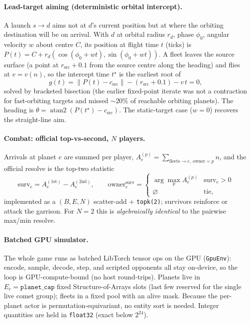 \documentclass[11pt]{article}
\newcommand{\cd}[1]{\texttt{#1}}
\begin{document}
\paragraph{Lead-target aiming (deterministic orbital intercept).} A launch $s\!\to\!d$ aims not at
$d$'s current position but at where the orbiting destination will be on arrival. With $d$ at orbital
radius $r_d$, phase $\phi_0$, angular velocity $w$ about centre $C$, its position at flight time $t$
(ticks) is $P(t)=C+r_d(\cos(\phi_0{+}wt),\sin(\phi_0{+}wt))$. A fleet leaves the source surface (a
point at $r_{\mathrm{src}}{+}0.1$ from the source centre along the heading) and flies at $v=v(n)$, so
the intercept time $t^\star$ is the earliest root of
\begin{equation}
g(t)=\lVert P(t)-c_{\mathrm{src}}\rVert-(r_{\mathrm{src}}{+}0.1)-v\,t=0,
\end{equation}
solved by bracketed bisection (the earlier fixed-point iterate was not a contraction for fast-orbiting
targets and missed $\sim$20\% of reachable orbiting planets). The heading is
$\theta=\operatorname{atan2}(P(t^\star)-c_{\mathrm{src}})$. The static-target case ($w{=}0$) recovers
the straight-line aim.

\paragraph{Combat: official top-vs-second, $N$ players.} Arrivals at planet $e$ are summed per player,
$A_e^{(p)}=\sum_{\text{fleets}\to e,\ \text{owner}=p}n$, and the official resolve is the top-two
statistic
\begin{equation}
\text{surv}_e=A_e^{(1\text{st})}-A_e^{(2\text{nd})},\qquad
\text{owner}^{\text{surv}}_e=\begin{cases}\arg\max_p A_e^{(p)} & \text{surv}_e>0\\
\varnothing & \text{tie,}\end{cases}
\end{equation}
implemented as a $(B,E,N)$ scatter-add $+$ \cd{topk(2)}; survivors reinforce or attack the garrison.
For $N{=}2$ this is \emph{algebraically identical} to the pairwise max/min resolve.

\paragraph{Batched GPU simulator.} The whole game runs as batched LibTorch tensor ops on the GPU
(\cd{GpuEnv}): encode, sample, decode, step, and scripted opponents all stay on-device, so the loop
is GPU-compute-bound (no host round-trips). Planets live in $E_c=\cd{planet\_cap}$ fixed
Structure-of-Arrays slots (last few reserved for the single live comet group); fleets in a fixed
pool with an alive mask. Because the per-planet actor is permutation-equivariant, no entity sort is
needed. Integer quantities are held in \cd{float32} (exact below $2^{24}$).
\end{document}
